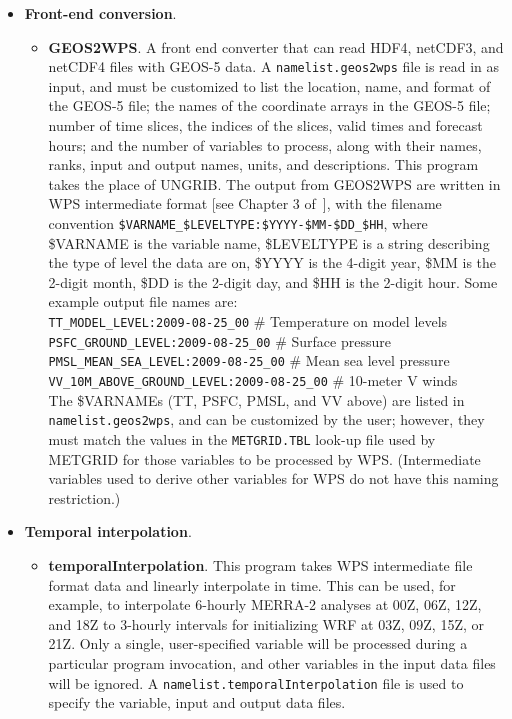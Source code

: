 \begin{itemize}
\item \textbf{Front-end conversion}. 
  \begin{itemize}
  \item \textbf{GEOS2WPS}.  A front end converter that can read HDF4, netCDF3,
    and netCDF4 files with GEOS-5 data.  A \texttt{namelist.geos2wps} file is
    read in as input, and must be customized to list the location, name, and 
    format of the GEOS-5 file; the names of the coordinate arrays in the GEOS-5
    file; number of time slices, the indices of the slices, valid times and 
    forecast hours; and the number of variables to process, along with their 
    names, ranks, input and output names, units, and descriptions.  This 
    program takes the place of UNGRIB.  The output from GEOS2WPS are written 
    in WPS intermediate format [see Chapter 3 of~\cite{ref:ArwUserGuide}], 
    with the filename convention 
    \texttt{\$VARNAME\_\$LEVELTYPE:\$YYYY-\$MM-\$DD\_\$HH}, where \$VARNAME is
    the variable name, \$LEVELTYPE is a string describing the type of level 
    the data are on, \$YYYY is the 4-digit year, \$MM is the 2-digit month, 
    \$DD is the 2-digit day, and \$HH is the 2-digit hour.  Some example 
    output file names are:\\


    \texttt{TT\_MODEL\_LEVEL:2009-08-25\_00}              \# Temperature on model levels \\
    \texttt{PSFC\_GROUND\_LEVEL:2009-08-25\_00}           \# Surface pressure \\
    \texttt{PMSL\_MEAN\_SEA\_LEVEL:2009-08-25\_00}        \# Mean sea level pressure \\
    \texttt{VV\_10M\_ABOVE\_GROUND\_LEVEL:2009-08-25\_00} \# 10-meter V winds \\

    The \$VARNAMEs (TT, PSFC, PMSL, and VV above) are listed in 
    \texttt{namelist.geos2wps}, and can be customized by the user; however, 
    they must match the values in the \texttt{METGRID.TBL} look-up file used 
    by METGRID for those variables to be processed by WPS.  (Intermediate 
    variables used to derive other variables for WPS do not have this naming 
    restriction.)
  \end{itemize}

\item \textbf{Temporal interpolation}. 

\begin{itemize}
\item \textbf{temporalInterpolation}. This program takes WPS
intermediate file format data and linearly interpolate in time. This can
be used, for example, to interpolate 6-hourly MERRA-2 analyses at 00Z, 06Z,
12Z, and 18Z to 3-hourly intervals for initializing WRF at 03Z, 09Z, 15Z,
or 21Z. Only a single, user-specified variable will be processed during a
particular program invocation, and other variables in the input data files
will be ignored. A \texttt{namelist.temporalInterpolation} file is used to
specify the variable, input and output data files.
\end{itemize}


\end{itemize}
